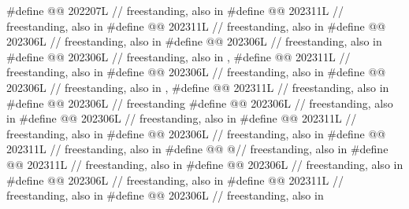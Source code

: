 \begin{codeblock}
#define @@                      202207L // freestanding, also in 
#define @@            202311L // freestanding, also in 
#define @@                202311L // freestanding, also in 
#define @@          202306L // freestanding, also in 
#define @@             202306L // freestanding, also in 
#define @@              202306L // freestanding, also in , 
#define @@              202311L // freestanding, also in 
#define @@               202306L // freestanding, also in 
#define @@                 202306L
  // freestanding, also in , 
#define @@             202311L // freestanding, also in 
#define @@  202306L // freestanding
#define @@           202306L // freestanding, also in 
#define @@             202306L // freestanding, also in 
#define @@               202311L // freestanding, also in 
#define @@               202306L // freestanding, also in 
#define @@              202311L // freestanding, also in 
#define @@         @\seebelow@ // freestanding, also in 
#define @@             202311L // freestanding, also in 
#define @@               202306L // freestanding, also in 
#define @@                202306L // freestanding, also in 
#define @@          202311L // freestanding, also in 
#define @@                202306L // freestanding, also in 

\end{codeblock}
